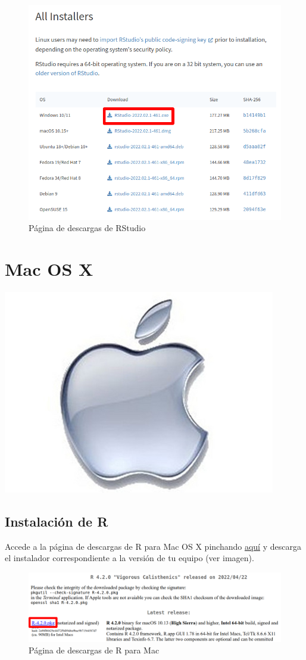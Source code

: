\documentclass[
  title=normal,
  notoc,
  bib=normal]{mnye}
\begin{document}
\begin{figure}

{\centering \includegraphics[width=0.9\linewidth]{images/rstudio-windows} 

}

\caption{Página de descargas de RStudio}\label{fig:unnamed-chunk-13}
\end{figure}

\hypertarget{mac}{%
\section{Mac OS X}\label{mac}}

\begin{center}\includegraphics[width=0.15\linewidth]{images/os/apple} \end{center}

\hypertarget{instalaciuxf3n-de-r-2}{%
\subsection{Instalación de R}\label{instalaciuxf3n-de-r-2}}

Accede a la página de descargas de \textsf{R} para Mac OS X pinchando \href{https://cloud.r-project.org/bin/macosx/}{aquí} y descarga el instalador correspondiente a la versión de tu equipo (ver imagen).

\begin{figure}

{\centering \includegraphics[width=1\linewidth]{images/r-mac} 

}

\caption{Página de descargas de R para Mac}\label{fig:unnamed-chunk-15}
\end{figure}
\end{document}

